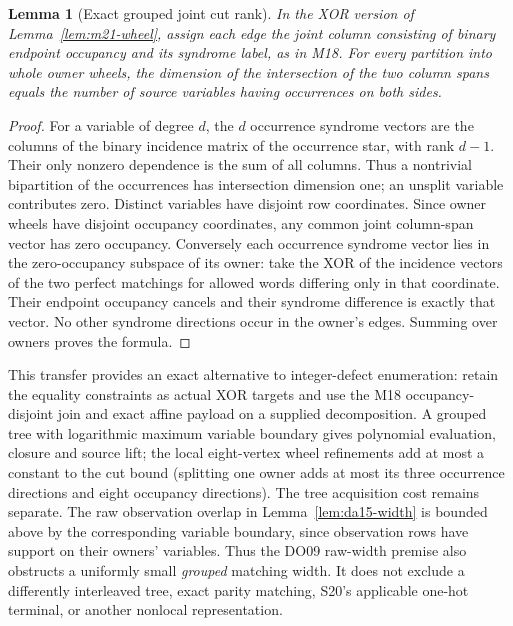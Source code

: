 \documentclass[11pt]{article}
\newtheorem{lemma}[theorem]{Lemma}
\begin{document}
\begin{lemma}[Exact grouped joint cut rank]\label{lem:m21-cut}
In the XOR version of Lemma~\ref{lem:m21-wheel}, assign each edge the joint column consisting of binary endpoint occupancy and its syndrome label, as in M18. For every partition into whole owner wheels, the dimension of the intersection of the two column spans equals the number of source variables having occurrences on both sides.
\end{lemma}
\begin{proof}
For a variable of degree $d$, the $d$ occurrence syndrome vectors are the columns of the binary incidence matrix of the occurrence star, with rank $d-1$. Their only nonzero dependence is the sum of all columns. Thus a nontrivial bipartition of the occurrences has intersection dimension one; an unsplit variable contributes zero. Distinct variables have disjoint row coordinates. Since owner wheels have disjoint occupancy coordinates, any common joint column-span vector has zero occupancy. Conversely each occurrence syndrome vector lies in the zero-occupancy subspace of its owner: take the XOR of the incidence vectors of the two perfect matchings for allowed words differing only in that coordinate. Their endpoint occupancy cancels and their syndrome difference is exactly that vector. No other syndrome directions occur in the owner's edges. Summing over owners proves the formula.
\end{proof}
This transfer provides an exact alternative to integer-defect enumeration: retain the equality constraints as actual XOR targets and use the M18 occupancy-disjoint join and exact affine payload on a supplied decomposition. A grouped tree with logarithmic maximum variable boundary gives polynomial evaluation, closure and source lift; the local eight-vertex wheel refinements add at most a constant to the cut bound (splitting one owner adds at most its three occurrence directions and eight occupancy directions). The tree acquisition cost remains separate. The raw observation overlap in Lemma~\ref{lem:da15-width} is bounded above by the corresponding variable boundary, since observation rows have support on their owners' variables. Thus the DO09 raw-width premise also obstructs a uniformly small \emph{grouped} matching width. It does not exclude a differently interleaved tree, exact parity matching, S20's applicable one-hot terminal, or another nonlocal representation.
\end{document}
